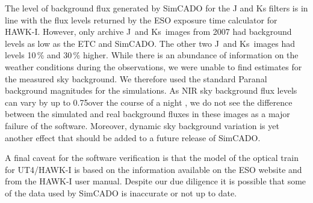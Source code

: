 The level of background flux generated by SimCADO for the J and Ks filters is in line with the flux levels returned by the ESO exposure time calculator for HAWK-I.
However, only archive J~and Ks~images from 2007 had background levels as low as the ETC and SimCADO.
The other two J~and Ks~images had levels 10\,\% and 30\,\% higher.
While there is an abundance of information on the weather conditions during the observations, we were unable to find estimates for the measured sky background.
We therefore used the standard Paranal background magnitudes for the simulations.
As NIR sky background flux levels can vary by up to 0.75\m over the course of a night \citep{moreels08}, we do not see the difference between the simulated and real background fluxes in these images as a major failure of the software.
Moreover, dynamic sky background variation is yet another effect that should be added to a future release of SimCADO.

A final caveat for the software verification is that the model of the optical train for UT4/HAWK-I is based on the information available on the ESO website and from the HAWK-I user manual.
Despite our due diligence it is possible that some of the data used by SimCADO is inaccurate or not up to date. 

